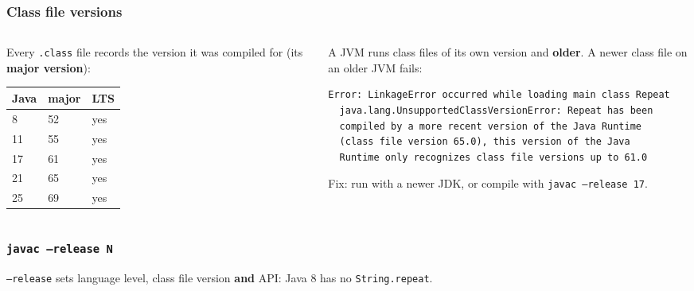\documentclass[aspectratio=169,10pt,compress]{beamer}
\begin{document}
\begin{frame}[t,fragile] \frametitle{Class file versions}
  \begin{columns}[T]
    \begin{column}{0.44\textwidth}
      \small Every \texttt{.class} file records the version it was compiled for (its \textbf{major version}):
      \vspace{0.3em}

      \begin{tabular}{@{}lll@{}}
        \toprule
        \textbf{Java} & \textbf{major} & \textbf{LTS} \\
        \midrule
        8  & 52 & yes \\
        11 & 55 & yes \\
        17 & 61 & yes \\
        21 & 65 & yes \\
        25 & 69 & yes \\
        \bottomrule
      \end{tabular}
    \end{column}
    \begin{column}{0.52\textwidth}
      \small A JVM runs class files of its own version and \textbf{older}. A newer class file on an older JVM fails:


\begin{lstlisting}[style=codesnippet, language={}, basicstyle=\ttfamily\tiny]
Error: LinkageError occurred while loading main class Repeat
  java.lang.UnsupportedClassVersionError: Repeat has been
  compiled by a more recent version of the Java Runtime
  (class file version 65.0), this version of the Java
  Runtime only recognizes class file versions up to 61.0
\end{lstlisting}



      \small Fix: run with a newer JDK, or compile with \texttt{javac --release 17}.
    \end{column}
  \end{columns}
\end{frame}




\begin{frame}[t,fragile] \frametitle{\texttt{javac --release N}}

  \vspace{0.2em}
  \small \texttt{--release} sets language level, class file version \textbf{and} API: Java 8 has no \texttt{String.repeat}.
\end{frame}
\end{document}
